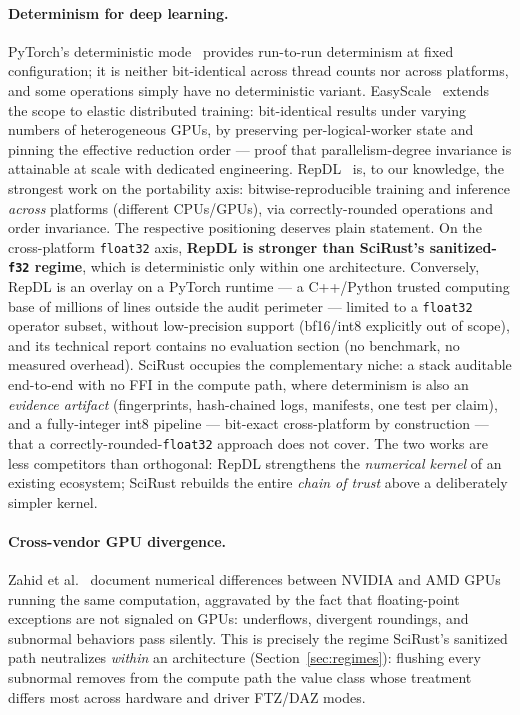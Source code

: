 \documentclass[sigconf,review]{acmart}
\begin{document}
\paragraph{Determinism for deep learning.}
PyTorch's deterministic mode~\cite{pytorchdet} provides run-to-run
determinism at fixed configuration; it is neither bit-identical across
thread counts nor across platforms, and some operations simply have no
deterministic variant. EasyScale~\cite{li2022easyscale} extends the scope to
elastic distributed training: bit-identical results under varying numbers of
heterogeneous GPUs, by preserving per-logical-worker state and pinning the
effective reduction order --- proof that parallelism-degree invariance is
attainable at scale with dedicated engineering.
RepDL~\cite{xie2025repdl} is, to our knowledge, the strongest work on the
portability axis: bitwise-reproducible training and inference \emph{across}
platforms (different CPUs/GPUs), via correctly-rounded operations and order
invariance. The respective positioning deserves plain statement. On the
cross-platform \texttt{float32} axis, \textbf{RepDL is stronger than
SciRust's sanitized-\texttt{f32} regime}, which is deterministic only within
one architecture. Conversely, RepDL is an overlay on a PyTorch runtime ---
a C++/Python trusted computing base of millions of lines outside the audit
perimeter --- limited to a \texttt{float32} operator subset, without
low-precision support (bf16/int8 explicitly out of scope), and its
technical report contains no evaluation section (no benchmark, no measured
overhead). SciRust occupies the complementary niche: a stack auditable
end-to-end with no FFI in the compute path, where determinism is also an
\emph{evidence artifact} (fingerprints, hash-chained logs, manifests, one
test per claim), and a fully-integer int8 pipeline --- bit-exact
cross-platform by construction --- that a correctly-rounded-\texttt{float32}
approach does not cover. The two works are less competitors than
orthogonal: RepDL strengthens the \emph{numerical kernel} of an existing
ecosystem; SciRust rebuilds the entire \emph{chain of trust} above a
deliberately simpler kernel.

\paragraph{Cross-vendor GPU divergence.}
Zahid et al.~\cite{zahid2024gpu} document numerical differences between
NVIDIA and AMD GPUs running the same computation, aggravated by the fact
that floating-point exceptions are not signaled on GPUs: underflows,
divergent roundings, and subnormal behaviors pass silently. This is
precisely the regime SciRust's sanitized path neutralizes \emph{within} an
architecture (Section~\ref{sec:regimes}): flushing every subnormal removes
from the compute path the value class whose treatment differs most across
hardware and driver FTZ/DAZ modes.
\end{document}
